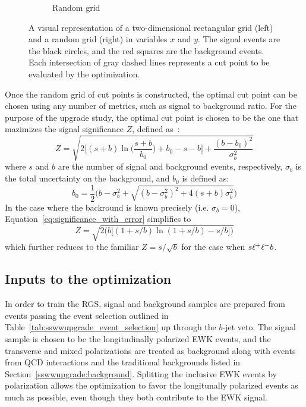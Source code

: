 \begin{figure}[htp]
\begin{subfigure}[b]{.48\textwidth}
    \caption{Random grid}
    \label{fig:rgs_grids_random}
  \end{subfigure}
  \caption{A visual representation of a two-dimensional rectangular grid (left) and a random grid (right) in variables $x$ and $y$.  The signal events are the black circles, and the red squares are the background events.  Each intersection of gray dashed lines represents a cut point to be evaluated by the optimization.}
  \label{fig:rgs_grids}
\end{figure}

Once the random grid of cut points is constructed, the optimal cut point can be chosen using any number of metrics, such as signal to background ratio.
For the purpose of the \ssww upgrade study, the optimal cut point is chosen to be the one that mazimizes the signal significance $Z$, defined as~\cite{2011.asimov-significance}:
\begin{equation}
Z = \sqrt{2{\bigg[}(s+b)\ln{\Big(}\frac{s+b}{b_0}{\Big)}+b_0-s-b{\bigg]}+\frac{(b-b_0)^2}{\sigma_b^2}}
\label{eq:significance_with_error}
\end{equation}
where $s$ and $b$ are the number of signal and background events, respectively, $\sigma_b$ is the total uncertainty on the background, and $b_0$ is defined as:
\begin{equation}
b_0 = \frac{1}{2}{\Big(}b-\sigma_b^2+\sqrt{(b-\sigma_b^2)^2+4(s+b)\sigma_b^2}{\Big)}
\label{eq:significance_b0}
\end{equation}
In the case where the backround is known precisely (i.e. $\sigma_b = 0$), Equation~\ref{eq:significance_with_error} simplifies to
\begin{equation}
Z = \sqrt{2\bigg(b\big[(1+s/b)\ln(1+s/b)-s/b\big]\bigg)}
\label{eq:significance_without_error}
\end{equation}
which further reduces to the familiar $Z = s/\sqrt{b}$ for the case when $s \muchless b$.

%
\subsection{Inputs to the optimization}\label{sswwupgrade:opt_inputs}
In order to train the RGS, signal and background samples are prepared from events passing the event selection outlined in Table~\ref{tab:sswwupgrade_event_selection} up through the $b$-jet veto.
The signal sample is chosen to be the longitudinally polarized \ssww EWK events, and the transverse and mixed polarizations are treated as background along with \ssww events from QCD interactions and the traditional backgrounds listed in Section~\ref{sswwupgrade:background}.
Splitting the inclusive \ssww EWK events by polarization allows the optimization to favor the longitunally polarized events as much as possible, even though they both contribute to the EWK signal.

